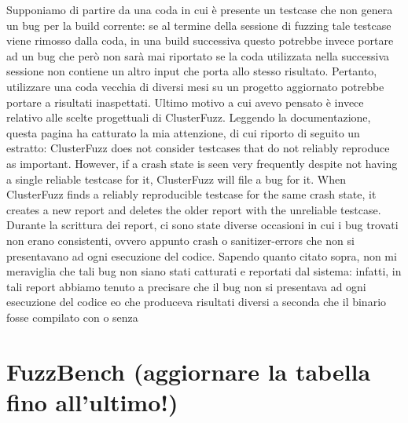 {Supponiamo di partire da una coda in cui è presente un testcase che non genera un bug per la build corrente: se al termine della sessione di fuzzing tale testcase viene rimosso dalla coda, in una build successiva questo potrebbe invece portare ad un bug che però non sarà mai riportato se la coda utilizzata nella successiva sessione non contiene un altro input che porta allo stesso risultato. Pertanto, utilizzare una coda vecchia di diversi mesi su un progetto aggiornato potrebbe portare a risultati inaspettati. Ultimo motivo a cui avevo pensato è invece relativo alle scelte progettuali di ClusterFuzz. Leggendo la documentazione, questa pagina ha catturato la mia attenzione, di cui riporto di seguito un estratto: ClusterFuzz does not consider testcases that do not reliably reproduce as important. However, if a crash state is seen very frequently despite not having a single reliable testcase for it, ClusterFuzz will file a bug for it. When ClusterFuzz finds a reliably reproducible testcase for the same crash state, it creates a new report and deletes the older report with the unreliable testcase. Durante la scrittura dei report, ci sono state diverse occasioni in cui i bug trovati non erano consistenti, ovvero appunto crash o sanitizer-errors che non si presentavano ad ogni esecuzione del codice.
Sapendo quanto citato sopra, non mi meraviglia che tali bug non siano stati catturati e reportati dal sistema: infatti, in tali report abbiamo tenuto a precisare che il bug non si presentava ad ogni esecuzione del codice eo che produceva risultati diversi a seconda che il binario fosse compilato con o senza}







 \newpage
\section{FuzzBench (aggiornare la tabella fino all'ultimo!)}

